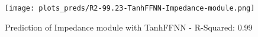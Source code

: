 
\begin{figure}[H]
    \centering
    \texttt{[image: plots\_preds/R2-99.23-TanhFFNN-Impedance-module.png]}
    \caption{Prediction of Impedance module with TanhFFNN - R-Squared: 0.99}
\end{figure}
